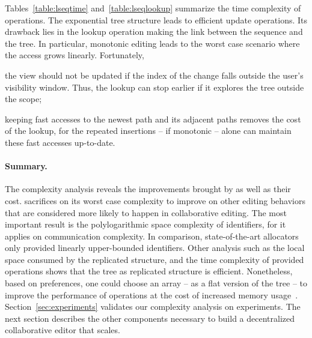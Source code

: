 Tables~\ref{table:lseqtime} and~\ref{table:lseqlookup} summarize the time
complexity of operations. The exponential tree structure leads to efficient
update operations. Its drawback lies in the lookup operation making the link
between the sequence and the tree. In particular, monotonic editing leads to the
worst case scenario where the access grows linearly. Fortunately,
\begin{inparaenum}[(i)]
\item the view should not be updated if the index of the change falls outside
  the user's visibility window. Thus, the lookup can stop earlier if it explores
  the tree outside the scope;
\item keeping fast accesses to the newest path and its adjacent paths removes
  the cost of the lookup, for the repeated insertions -- if monotonic -- alone
  can maintain these fast accesses up-to-date.
\end{inparaenum}


\paragraph{Summary.}

The complexity analysis reveals the improvements brought by \LSEQ as well as
their cost.  \LSEQ sacrifices on its worst case complexity to improve on other
editing behaviors that are considered more likely to happen in collaborative
editing. The most important result is the polylogarithmic space complexity of
identifiers, for it applies on communication complexity. In comparison,
state-of-the-art allocators~\cite{preguica2009commutative, weiss2009logoot} only
provided linearly upper-bounded identifiers. Other analysis such as the local
space consumed by the replicated structure, and the time complexity of provided
operations shows that the tree as replicated structure is
efficient. Nonetheless, based on preferences, one could choose an array -- as a
flat version of the tree -- to improve the performance of operations at the cost
of increased memory usage~\cite{weiss2009logoot}.  Section~\ref{sec:experiments}
validates our complexity analysis on experiments. The next section describes the
other components necessary to build a decentralized collaborative editor that
scales.

